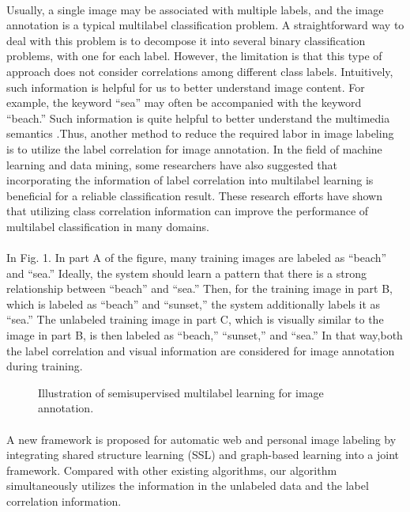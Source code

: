 \documentclass[a4paper,11pt]{report}
\begin{document}
\paragraph{}Usually, a single image may be associated with multiple labels,
and the image annotation is a typical multilabel classification
problem. A straightforward way to deal with this problem is
to decompose it into several binary classification problems, with
one for each label. However, the limitation is that this type of
approach does not consider correlations among different class
labels. Intuitively, such information is helpful for us to better
understand image content. For example, the keyword “sea” may
often be accompanied with the keyword “beach.” Such information
is quite helpful to better understand the multimedia semantics
.Thus, another method to reduce the required labor
in image labeling is to utilize the label correlation for image annotation.
In the field of machine learning and data mining, some
researchers have also suggested that incorporating the information
of label correlation into multilabel learning is beneficial for
a reliable classification result. These research efforts
have shown that utilizing class correlation information can improve
the performance of multilabel classification in many domains.
\paragraph{}In Fig. 1. In part A of the
figure, many training images are labeled as “beach” and “sea.”
Ideally, the system should learn a pattern that there is a strong
relationship between “beach” and “sea.” Then, for the training
image in part B, which is labeled as “beach” and “sunset,” the
system additionally labels it as “sea.” The unlabeled training
image in part C, which is visually similar to the image in part B, is then labeled as “beach,” “sunset,” and “sea.” In that way,both the label correlation and visual information are considered
for image annotation during training.
\begin{figure}
\begin{center}

\caption{Illustration of semisupervised multilabel learning for image annotation.}
\label{fig:butterfly}
\end{center}
\end{figure}
\paragraph{}A new framework is proposed for automatic
web and personal image labeling by integrating shared structure
learning (SSL) and graph-based learning into a joint framework.
Compared with other existing algorithms, our algorithm simultaneously
utilizes the information in the unlabeled data and the
label correlation information.
\end{document}
